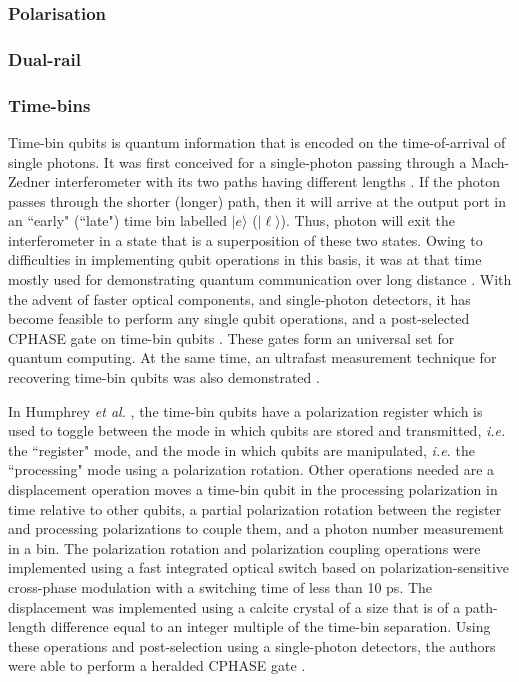\documentclass[aps,rmp,twocolumn,amsmath,amssymb,nofootinbib,superscriptaddress]{revtex4}
\newcommand{\ket}[1]{|#1\rangle}
\begin{document}
\subsubsection{Polarisation}

\subsubsection{Dual-rail}

\subsubsection{Time-bins}
Time-bin qubits is quantum information that is encoded on the time-of-arrival of single photons. It was first conceived for a single-photon passing through a Mach-Zedner interferometer with its two paths having different lengths \cite{bib:Brendel99}. If the photon passes through the shorter (longer) path, then it will arrive at the output port in an ``early" (``late") time bin labelled $\ket{e}$ ($\ket{\ell}$). Thus, photon will exit the interferometer in a state that is a superposition of these two states. Owing to difficulties in implementing qubit operations in this basis, it was at that time mostly used for demonstrating quantum communication over long distance \cite{bib:Thew02,bib:Marcikic04}. With the advent of faster optical components, and single-photon detectors, it has become feasible to perform any single qubit operations, and a post-selected CPHASE gate on time-bin qubits \cite{bib:Humphreys2013}. These gates form an universal set for quantum computing. At the same time, an ultrafast measurement technique for recovering time-bin qubits was also demonstrated \cite{bib:Donohue2013}.

In Humphrey {\it et al.} \cite{bib:Humphreys2013}, the time-bin qubits have a polarization register which is used to toggle between the mode in which qubits are stored and transmitted, {\it i.e.} the ``register" mode, and the mode in which qubits are manipulated, {\it i.e.} the ``processing" mode using a polarization rotation. Other operations needed are a displacement operation moves a time-bin qubit in the processing polarization in time relative to other qubits, a partial polarization rotation between the register and processing polarizations to couple them, and a photon number measurement in a bin. The polarization rotation and polarization coupling operations were implemented using a fast integrated optical switch based on polarization-sensitive cross-phase modulation with a switching time of less than 10 ps. The displacement was implemented using a calcite crystal of a size that is of a path-length difference equal to an integer multiple of the time-bin separation. Using these operations and post-selection using a single-photon detectors, the authors were able to perform a heralded CPHASE gate \cite{bib:KLM01}.
\end{document}
